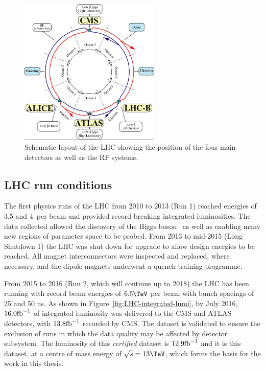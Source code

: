 \begin{figure}
\centering
    \includegraphics[width=0.6\textwidth]{./Figures/detector/lhcDiagram}
  \caption{Schematic layout of the LHC showing the position of the four main detectors as
  well as the RF systems.}
  \label{fig:LHC-diagram}
\end{figure}

\subsection{LHC run conditions}

The first physics runs of the LHC from 2010 to 2013 (Run 1) reached energies of 3.5 and 4\TeV~per beam and 
provided record-breaking integrated luminosities. The data collected allowed the 
discovery of the Higgs boson~\cite{cmsHiggs,atlasHiggs} as well as enabling many new regions of parameter space
to be probed. From 2013 to mid-2015 (Long Shutdown 1) the LHC was shut down for upgrade to allow design
energies to be reached. All magnet interconnectors were inspected and replaced, where necessary,
and the dipole magnets underwent a quench training programme. 

From 2015 to 2016 (Run 2, which will continue up to 2018) the LHC has been running with record beam energies 
of $6.5 \TeV$ per beam with bunch spacings of 25 and 50 ns. 
As shown in Figure~\ref{fig:LHC-integrated-lumi}, by July 2016, $16.0 \text{fb}^{-1}$ of integrated luminosity was
delivered to the CMS and ATLAS detectors, with $13.8 \text{fb}^{-1}$ recorded by CMS. The dataset is validated 
to ensure the exclusion of runs in which the data quality may be affected by detector subsystem. 
The luminosity of this \emph{certified} dataset is $12.9 \text{fb}^{-1}$ and it is this dataset, 
at a centre of mass energy of $\sqrt{s} = 13 \TeV$, which forms the basis for the work in this thesis.

